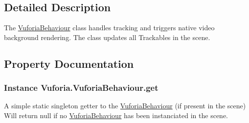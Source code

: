 \subsection{Detailed Description}
The \hyperlink{class_vuforia_1_1_vuforia_behaviour}{Vuforia\+Behaviour} class handles tracking and triggers native video background rendering. The class updates all Trackables in the scene. 



\subsection{Property Documentation}
\hypertarget{class_vuforia_1_1_vuforia_behaviour_ab45dcaa07abe911c78048f8c3a8badc5_ab45dcaa07abe911c78048f8c3a8badc5}{}
\subsubsection[{get}]{ Instance Vuforia.\+Vuforia\+Behaviour.\+get\hspace{0.3cm}{\ttfamily [static]}}\label{class_vuforia_1_1_vuforia_behaviour_ab45dcaa07abe911c78048f8c3a8badc5_ab45dcaa07abe911c78048f8c3a8badc5}


A simple static singleton getter to the \hyperlink{class_vuforia_1_1_vuforia_behaviour}{Vuforia\+Behaviour} (if present in the scene) Will return null if no \hyperlink{class_vuforia_1_1_vuforia_behaviour}{Vuforia\+Behaviour} has been instanciated in the scene. 


